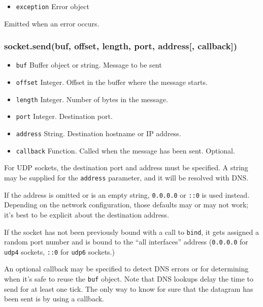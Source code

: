 \begin{itemize}
\itemsep1pt\parskip0pt
\item
  \texttt{exception} Error object
\end{itemize}

Emitted when an error occurs.

\subsubsection{socket.send(buf, offset, length, port, address{[},
callback{]})}\label{socket.sendbuf-offset-length-port-address-callback}

\begin{itemize}
\itemsep1pt\parskip0pt
\item
  \texttt{buf} Buffer object or string. Message to be sent
\item
  \texttt{offset} Integer. Offset in the buffer where the message
  starts.
\item
  \texttt{length} Integer. Number of bytes in the message.
\item
  \texttt{port} Integer. Destination port.
\item
  \texttt{address} String. Destination hostname or IP address.
\item
  \texttt{callback} Function. Called when the message has been sent.
  Optional.
\end{itemize}

For UDP sockets, the destination port and address must be specified. A
string may be supplied for the \texttt{address} parameter, and it will
be resolved with DNS.

If the address is omitted or is an empty string,
\texttt{\textquotesingle{}0.0.0.0\textquotesingle{}} or
\texttt{\textquotesingle{}::0\textquotesingle{}} is used instead.
Depending on the network configuration, those defaults may or may not
work; it's best to be explicit about the destination address.

If the socket has not been previously bound with a call to
\texttt{bind}, it gets assigned a random port number and is bound to the
``all interfaces'' address
(\texttt{\textquotesingle{}0.0.0.0\textquotesingle{}} for \texttt{udp4}
sockets, \texttt{\textquotesingle{}::0\textquotesingle{}} for
\texttt{udp6} sockets.)

An optional callback may be specified to detect DNS errors or for
determining when it's safe to reuse the \texttt{buf} object. Note that
DNS lookups delay the time to send for at least one tick. The only way
to know for sure that the datagram has been sent is by using a callback.

